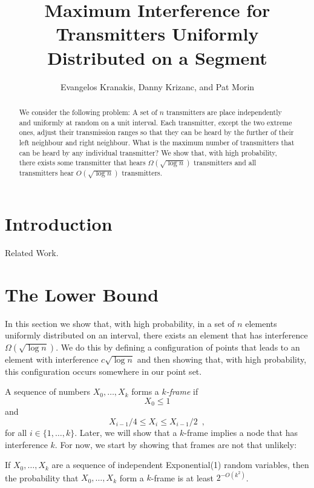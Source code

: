 \documentclass{patmorin}
\title{Maximum Interference for Transmitters Uniformly Distributed on a Segment}
\author{Evangelos Kranakis, Danny Krizanc, and Pat Morin}
\begin{document}
\maketitle

\begin{abstract}
We consider the following problem: A set of $n$ transmitters are
place independently and uniformly at random on a unit interval.  Each
transmitter, except the two extreme ones, adjust their transmission ranges
so that they can be heard by the further of their left neighbour and right
neighbour.  What is the maximum number of transmitters that can be heard
by any individual transmitter?  We show that, with high probability,
there exists some transmitter that hears $\Omega(\sqrt{\log n})$
transmitters and all transmitters hear $O(\sqrt{\log n})$ transmitters.
\end{abstract}

\section{Introduction}

Related Work.

\section{The Lower Bound}

In this section we show that, with high probability, in a set of $n$
elements uniformly distributed on an interval, there exists an element
that has interference $\Omega(\sqrt{\log n})$.  We do this by defining
a configuration of points that leads to an element with interference
$c\sqrt{\log n}$ and then showing that, with high probability, this
configuration occurs somewhere in our point set.

A sequence of numbers $X_0,\ldots,X_k$ forms a \emph{$k$-frame} if
\[
     X_0 \le 1
\]
and
\[
     X_{i-1}/4 \le X_i \le X_{i-1}/2 \enspace ,
\]
for all $i\in\{1,\ldots,k\}$.  Later, we will show that a $k$-frame
implies a node that has interference $k$.  For now, we start by showing
that frames are not that unlikely:

\begin{lem}
If $X_0,\ldots,X_k$ are a sequence of independent Exponential(1) random
variables, then the probability that $X_0,\ldots,X_k$ form a $k$-frame
is at least $2^{-O(k^2)}$.
\end{lem}
\end{document}
